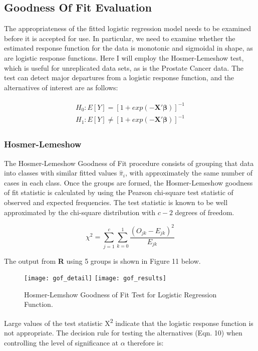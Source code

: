 \subsection{Goodness Of Fit Evaluation}
The appropriateness of the fitted logistic regression model needs to be examined before it is accepted for use. In particular, we need to examine whether the estimated response function for the data is monotonic and sigmoidal in shape, as are logistic response functions. Here I will employ the Hosmer-Lemeshow test, which is useful for unreplicated data sets, as is the Prostate Cancer data. The test can detect major departures from a logistic response function, and the alternatives of interest are as follows:

\begin{align}
\begin{split}
	H_0: E[Y]=  [1+exp(-\textbf{X}'\boldsymbol{\beta})]^{-1} \\
	H_1: E[Y] \neq  [1+exp(-\textbf{X}'\boldsymbol{\beta})]^{-1}
\end{split}
\end{align}

\subsubsection{Hosmer-Lemeshow}
The Hosmer-Lemeshow Goodness of Fit procedure consists of grouping that data into classes with similar fitted values \(\hat{\pi}_i\), with approximately the same number of cases in each class. Once the groups are formed, the Hosmer-Lemeshow goodness of fit statistic is calculated by using the Pearson chi-square test statistic of observed and expected frequencies. The test statistic is known to be well approximated by the chi-square distribution with \(c-2\) degrees of freedom.

\begin{equation}
	\chi^2 = \sum_{j=1}^{c} \sum_{k=0}^{1} \frac{(O_{jk}-E_{jk})^2}{E_{jk}}
\end{equation}

The output from \textbf{R} using 5 groups is shown in Figure 11 below.

\begin{figure}[H]
	\centering
	\texttt{[image: gof\_detail]}
	\texttt{[image: gof\_results]}
	\caption{Hosmer-Lemshow Goodness of Fit Test for Logistic Regression Function.}
\end{figure}

Large values of the test statistic X\textsuperscript{2} indicate that the logistic response function is not appropriate. The decision rule for testing the alternatives (Eqn. 10) when controlling the level of significance at \(\alpha\) therefore is:


